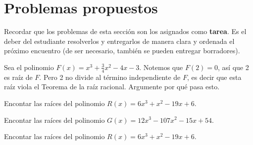 \section{Problemas propuestos}

Recordar que los problemas de esta sección son los asignados como \textbf{tarea}.
Es el deber del estudiante resolverlos y entregarlos de manera clara y ordenada el próximo encuentro
(de ser necesario, también se pueden entregar borradores).

\begin{section-problem}
    Sea el polinomio $F(x) = x^3 + \frac{3}{4}x^2 - 4x - 3$.
    Notemos que $F(2) = 0$, así que 2 es raíz de $F$.
    Pero 2 no divide al término independiente de $F$, es decir que esta raíz viola el Teorema de la raíz racional.
    Argumente por qué pasa esto.
\end{section-problem}

\begin{section-problem}
    Encontar las raíces del polinomio $R(x) = 6x^3 + x^2 - 19x + 6$.
\end{section-problem}

\begin{section-problem}
    Encontar las raíces del polinomio $G(x) = 12x^3 - 107x^2 - 15x + 54$.
\end{section-problem}

\begin{section-problem}
    Encontar las raíces del polinomio $R(x) = 6x^3 + x^2 - 19x + 6$.
\end{section-problem}